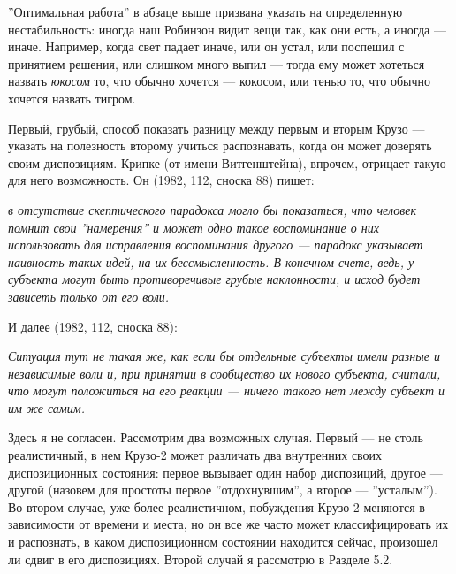 \documentclass[11pt]{book}
\begin{document}
''Оптимальная работа'' в абзаце выше призвана указать на определенную нестабильность: иногда наш Робинзон видит вещи так, как они есть, а иногда --- иначе. Например, когда свет падает иначе, или он устал, или поспешил с принятием решения, или слишком много выпил --- тогда ему может хотеться назвать \textit{юкосом} то, что обычно хочется --- кокосом, или тенью то, что обычно хочется назвать тигром.

Первый, грубый, способ показать разницу между первым и вторым Крузо --- указать на полезность второму учиться распознавать, когда он может доверять своим диспозициям. Крипке (от имени Витгенштейна), впрочем, отрицает такую для него возможность. Он (1982, 112, сноска 88) пишет:

\smallskip

\textit{в отсутствие скептического парадокса могло бы показаться, что человек помнит свои ''намерения'' и может одно такое воспоминание о них использовать для исправления воспоминания другого --- парадокс указывает наивность таких идей, на их бессмысленность. В конечном счете, ведь, у субъекта могут быть противоречивые грубые наклонности, и исход будет зависеть только от его воли.}

\smallskip

И далее (1982, 112, сноска 88):

\smallskip

\textit{Ситуация тут не такая же, как если бы отдельные субъекты имели разные и независимые воли и, при принятии в сообщество их нового субъекта, считали, что могут положиться на его реакции --- ничего такого нет между субъект и им же самим.}

\smallskip

Здесь я не согласен. Рассмотрим два возможных случая. Первый --- не столь реалистичный, в нем Крузо-2 может различать два внутренних своих диспозиционных состояния: первое вызывает один набор диспозиций, другое --- другой (назовем для простоты первое ''отдохнувшим'', а второе --- ''усталым''). Во втором случае, уже более реалистичном, побуждения Крузо-2 меняются в зависимости от времени и места, но он все же часто может классифицировать их и распознать, в каком диспозиционном состоянии находится сейчас, произошел ли сдвиг в его диспозициях. Второй случай я рассмотрю в Разделе 5.2.
\end{document}
